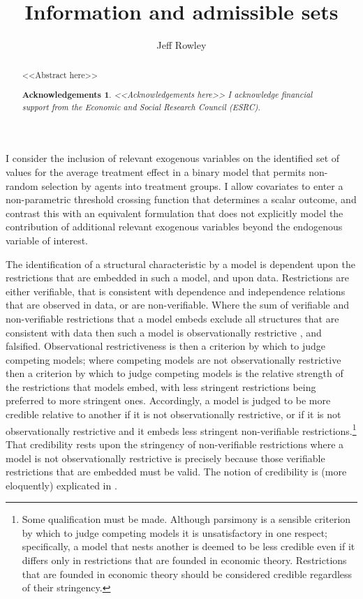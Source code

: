 \documentclass[10pt,a4paper,twoside]{article}
\title{Information and admissible sets}
\author{Jeff Rowley}
\newtheorem*{Acknowledgements}{Acknowledgements}
\numberwithin{equation}{subsection}
\newcommand{\ESRC}{I acknowledge financial support from the Economic and Social Research Council (ESRC).}
\begin{document}
\maketitle
\vspace{10mm}
\begin{abstract}
\noindent <<Abstract here>>
\begin{Acknowledgements}
<<Acknowledgements here>>
\ESRC
\end{Acknowledgements}
\end{abstract}
\vspace{5mm}
\noindent I consider the inclusion of relevant exogenous variables on the identified set of values for the average treatment effect in a binary model that permits non-random selection by agents into treatment groups. I allow covariates to enter a non-parametric threshold crossing function that determines a scalar outcome, and contrast this with an equivalent formulation that does not explicitly model the contribution of additional relevant exogenous variables beyond the endogenous variable of interest.

The identification of a structural characteristic by a model is dependent upon the restrictions that are embedded in such a model, and upon data. Restrictions are either verifiable, that is consistent with dependence and independence relations that are observed in data, or are non-verifiable. Where the sum of verifiable and non-verifiable restrictions that a model embeds exclude all structures that are consistent with data then such a model is observationally restrictive \citep{krE50}, and falsified. Observational restrictiveness is then a criterion by which to judge competing models; where competing models are not observationally restrictive then a criterion by which to judge competing models is the relative strength of the restrictions that models embed, with less stringent restrictions being preferred to more stringent ones. Accordingly, a model is judged to be more credible relative to another if it is not observationally restrictive, or if it is not observationally restrictive and it embeds less stringent non-verifiable restrictions.\footnote{Some qualification must be made. Although parsimony is a sensible criterion by which to judge competing models it is unsatisfactory in one respect; specifically, a model that nests another is deemed to be less credible even if it differs only in restrictions that are founded in economic theory. Restrictions that are founded in economic theory should be considered credible regardless of their stringency.} That credibility rests upon the stringency of non-verifiable restrictions where a model is not observationally restrictive is precisely because those verifiable restrictions that are embedded must be valid. The notion of credibility is (more eloquently) explicated in \cite{book.manski}. 
\end{document}
